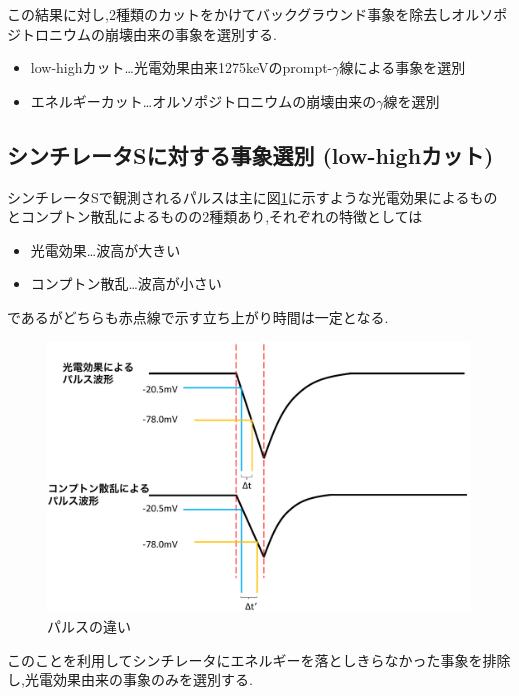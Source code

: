 この結果に対し,2種類のカットをかけてバックグラウンド事象を除去しオルソポジトロニウムの崩壊由来の事象を選別する.
\begin{itemize}
	\item low-highカット…光電効果由来1275keVのprompt-$\gamma$線による事象を選別
	\item エネルギーカット…オルソポジトロニウムの崩壊由来の$\gamma$線を選別
\end{itemize}

\subsection{シンチレータSに対する事象選別 (low-highカット)}
シンチレータSで観測されるパルスは主に図\ref{fig:pulse_diff}に示すような光電効果によるものとコンプトン散乱によるものの2種類あり,それぞれの特徴としては
\begin{itemize}
	\item 光電効果…波高が大きい
	\item コンプトン散乱…波高が小さい
\end{itemize}
であるがどちらも赤点線で示す立ち上がり時間は一定となる.
\begin{figure}[H]
	\centering
		\includegraphics[width=15cm]{fig/isb/pulse_difference.pdf}
		\caption{パルスの違い}
		\label{fig:pulse_diff}
\end{figure}
このことを利用してシンチレータにエネルギーを落としきらなかった事象を排除し,光電効果由来の事象のみを選別する.

